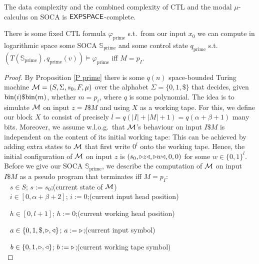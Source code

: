 \documentclass[times,envcountsame]{llncs}
\newcommand{\prim}{\text{prime}}
\def\CTL{{\text{CTL}}}
\newcommand{\Soca}{\mathbb{S}}
\begin{document}
\begin{theorem}
The data complexity and the combined complexity of CTL
and the modal $\mu$-calculus on SOCA is ${\mathsf{EXPSPACE}}$-complete.
\end{theorem}



\iffalse
\begin{lemma}{\label{L prim}} There is some fixed $\CTL$ formula $\varphi_\prim$ s.t.\
from our input $x_0$ we can compute in logarithmic space some SOCA
$\Soca_\prim$ and some control state $q_\prim$ s.t.\
$(T(\Soca_\prim),q_\prim(v))\models\varphi_\prim$ %
iff $M=p_I$.
\end{lemma}
\begin{proof}
By Proposition \ref{P prime} there is some $q(n)$ space-bounded Turing machine
$\mathcal{M}=(S,\Sigma,s_0,F,\mu)$
over the alphabet $\Sigma=\{0,1,\$\}$ that decides,
given $\text{bin}(i)\$\text{bin}(m)$, whether $m=p_i$, where $q$ is some polynomial.
The idea is to simulate $\mathcal{M}$ on input $z=I\$M$ and using $X$ as a working tape.
For this, we define our block $X$ to consist of precisely
$l=q(|I|+|M|+1)=q(\alpha+\beta+1)$ many bits.
Moreover, we assume w.l.o.g.\ that $\mathcal{M}$'s behaviour on input $I\$M$ is
independent on the content of its initial working tape: This can be
achieved by adding extra states to $\mathcal{M}$ that first write $0^l$ onto
the working tape.
Hence, the initial configuration of $\mathcal{M}$ on input $z$ is
$(s_0,\triangleright z\triangleleft,\triangleright w \triangleleft,0,0)$ for some $w\in\{0,1\}^l$.
\iffalse
Before we give our SOCA $\Soca_\prim$, we describe the computation of
$\mathcal{M}$ on input $I\$M$ as a pseudo program that terminates iff $M=p_I$:\\


\ \hspace{2cm} $s\in S$; $s:=s_0$;\quad  (current state of $\mathcal{M}$)\\[-0.4cm]

\ \hspace{2cm} $i\in[0,\alpha+\beta+2]$; $i:=0$;\quad (current input head position)

\ \hspace{2cm} $h\in[0,l+1]$; $h:=0$;\quad (current working head position)

\ \hspace{2cm} $a\in\{0,1,\$,\triangleright,\triangleleft\}$; $a:=\triangleright$;\quad (current input symbol)

\ \hspace{2cm} $b\in\{0,1,\triangleright,\triangleleft\}$; $b:=\triangleright$;\quad (current working tape
symbol)\\[0.05cm]


\end{proof}
\end{document}
